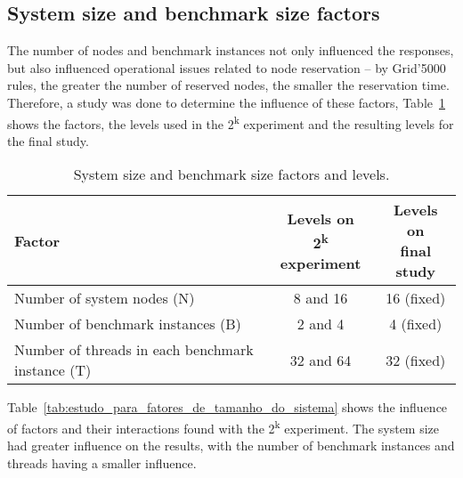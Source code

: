 \documentclass[man,floatsintext,12pt]{apa6}
\begin{document}
\subsection{System size and benchmark size factors}

The number of nodes and benchmark instances not only influenced the responses,
but also influenced operational issues related to node reservation -- by
Grid'5000 rules, the greater the number of reserved nodes, the smaller the
reservation time. Therefore, a study was done to determine the influence of
these factors, Table~\ref{tab:system_size_and_benchmark_size_factors} shows the
factors, the levels used in the 2\textsuperscript{k} experiment and the
resulting levels for the final study.

\begin{table}[h!]
\caption{System size and benchmark size factors and levels.}
\label{tab:system_size_and_benchmark_size_factors}
\begin{tabular}{lcc} \toprule

Factor & \thead{Levels on \\ 2\textsuperscript{k} experiment} & \thead{Levels on \\final study} \\ \midrule

Number of system nodes (N) & 8 and 16 & 16 (fixed) \\

Number of benchmark instances (B) & 2 and 4 & 4 (fixed) \\

Number of threads in each benchmark instance (T) & 32 and 64 & 32 (fixed) \\ \bottomrule

\end{tabular}
\end{table}

Table~\ref{tab:estudo_para_fatores_de_tamanho_do_sistema} shows the influence
of factors and their interactions found with the 2\textsuperscript{k}
experiment. The system size had greater influence on the results, with the
number of benchmark instances and threads having a smaller influence.
\end{document}
